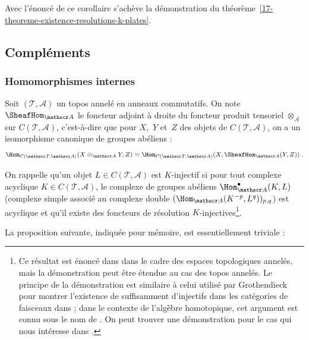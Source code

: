 \documentclass[10pt]{../fichiers-configuration-latex/smfart}
\begin{document}
Avec l'énoncé de ce corollaire s'achève la démonstration du
théorème~\ref{17-theoreme-existence-resolutions-k-plates}.

\subsection{Compléments}%
\subsubsection{Homomorphismes internes}%

\begin{definition3}
Soit $(\mathscr T,\mathscr A)$ un topos annelé en anneaux commutatifs. On
note $\SheafHom_{\mathscr A}$ le foncteur adjoint à droite du foncteur
produit tensoriel $\otimes_{\mathscr A}$ sur $C(\mathscr T,\mathscr A)$,
c'est-à-dire que pour $X$, $Y$ et $Z$ des objets de $C(\mathscr T,\mathscr
A)$, on a un isomorphisme canonique de groupes abéliens :
\[\Hom_{C(\mathscr T,\mathscr A)}(X\otimes_{\mathscr A} Y,Z)\simeq 
\Hom_{C(\mathscr T,\mathscr A)}(X,\SheafHom_{\mathscr A}(Y,Z))\;\text{.}\]
\end{definition3}

On rappelle qu'un objet $L\in C(\mathscr T,\mathscr A)$ est $K$-injectif si
pour tout complexe acyclique $K\in C(\mathscr T,\mathscr A)$, le complexe
de groupes abéliens $\Hom^\bullet_{\mathscr A}(K,L)$ (complexe simple
associé au complexe double $(\Hom_{\mathscr A}(K^{-p},L^q))_{p,q}$) est
acyclique et qu'il existe des foncteurs de résolution
$K$-injectives\;\footnote{Ce résultat est énoncé dans
\cite[§4]{RUC@Spaltenstein} dans le cadre des espaces topologiques annelés,
mais la démonstration peut être étendue au cas des topos annelés. Le
principe de la démonstration est similaire à celui utilisé par Grothendieck
pour montrer l'existence de suffisamment d'injectifs dans les catégories de
faisceaux dans \cite[§I.10]{Tohoku@Grothendieck} ; dans le contexte de l'algèbre
homotopique, cet argument est connu sous le nom de . On peut trouver une démonstration pour le cas qui nous
intéresse dans \cite{Complexes@Hovey}.}.

La proposition suivante, indiquée pour mémoire, est essentiellement
triviale :
\end{document}
